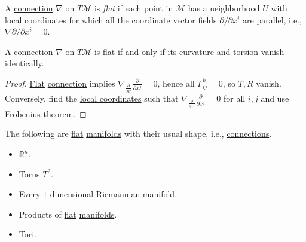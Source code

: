 \begin{definition}[Flat]\label{def:connection-flat}
	A \hyperref[def:linear-connection]{connection} \(\nabla \) on \(T \mathcal{M} \) is \emph{flat} if each point in \(\mathcal{M} \) has a neighborhood \(U\) with \hyperref[def:coordinate-chart]{local coordinates} for which all the coordinate \hyperref[def:vector-field]{vector fields} \(\partial / \partial x^i\) are \hyperref[def:parallel]{parallel}, i.e., \(\nabla \partial / \partial x^i = 0\).
\end{definition}

\begin{theorem}
	A \hyperref[def:linear-connection]{connection} \(\nabla \) on \(T \mathcal{M} \) is \hyperref[def:connection-flat]{flat} if and only if its \hyperref[def:Riemannian-curvature]{curvature} and \hyperref[def:torsion]{torsion} vanish identically.
\end{theorem}
\begin{proof}
	\hyperref[def:connection-flat]{Flat} \hyperref[def:linear-connection]{connection} implies \(\nabla _{\frac{\partial }{\partial x^i} } \frac{\partial }{\partial x^j} = 0\), hence all \(\Gamma ^k _{ij} = 0\), so \(T, R\) vanish. Conversely, find the \hyperref[def:coordinate-chart]{local coordinates} such that \(\nabla _{\frac{\partial }{\partial x^i} } \frac{\partial }{\partial x^j} = 0\) for all \(i, j\) and use \href{https://en.wikipedia.org/wiki/Frobenius_theorem_(differential_topology)}{Frobenius theorem}.
\end{proof}

\begin{eg}
	The following are \hyperref[def:connection-flat]{flat} \hyperref[def:smooth-manifold]{manifolds} with their usual shape, i.e., \hyperref[def:linear-connection]{connections}.
	\begin{multicols}{2}
		\begin{itemize}
			\item \(\mathbb{R} ^n\).
			\item Torus \(T^2\).
			\item Every \(1\)-dimensional \hyperref[def:Riemannian-manifold]{Riemannian manifold}.
			\item Products of \hyperref[def:connection-flat]{flat} \hyperref[def:smooth-manifold]{manifolds}.
			\item Tori.
		\end{itemize}
	\end{multicols}
\end{eg}

